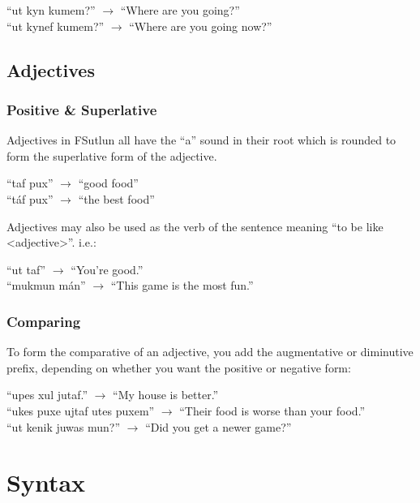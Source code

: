 \documentclass{book}
\begin{document}
\begin{center}
    ``ut kyn kumem?'' $\rightarrow$ ``Where are you going?'' \\
    ``ut kynef kumem?'' $\rightarrow$ ``Where are you going now?''
\end{center}


\section{Adjectives}
\subsection{Positive \& Superlative}
Adjectives in FSutlun all have the ``a'' sound in their root which is rounded to form the superlative
form of the adjective.

\begin{center}
    ``taf pux'' $\rightarrow$ ``good food'' \\
    ``táf pux'' $\rightarrow$ ``the best food''
\end{center}

Adjectives may also be used as the verb of the sentence meaning ``to be like <adjective>''. i.e.:

\begin{center}
    ``ut taf'' $\rightarrow$ ``You're good.'' \\
    ``mukmun mán'' $\rightarrow$ ``This game is the most fun.''
\end{center}

\subsection{Comparing}
To form the comparative of an adjective, you add the augmentative or diminutive prefix, depending
on whether you want the positive or negative form:

\begin{center}
    ``upes xul jutaf.'' $\rightarrow$ ``My house is better.'' \\
    ``ukes puxe ujtaf utes puxem'' $\rightarrow$ ``Their food is worse than your food.'' \\
    ``ut kenik juwas mun?'' $\rightarrow$ ``Did you get a newer game?''
\end{center}


\chapter{Syntax}
\end{document}
